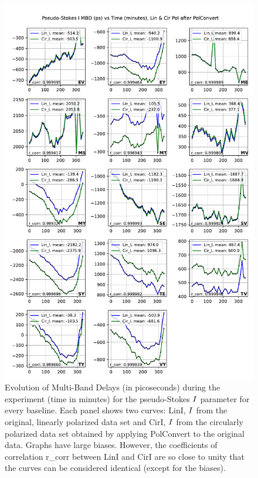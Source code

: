 \documentclass[letterpaper,twoside,12pt]{article}
\begin{document}
\begin{figure}[ht!]
  \begin{center}
  \includegraphics[width=33pc]{MBD_Lin_I_and_Cir_I.pdf}
  \caption{\small Evolution of Multi-Band Delays (in picoseconds) during the experiment (time in minutes) for the pseudo-Stokes $\protect I$ parameter for every baseline. Each panel shows two curves: LinI, $\protect I$ from the original, linearly polarized data set and CirI, $\protect I$ from the circularly polarized data set obtained by applying PolConvert to the original data. Graphs have large biases. However, the coefficients of correlation r\_corr between LinI and CirI are so close to unity that the curves can be considered identical (except for the biases).}
  \label{mbd_lin_and_cir}
  \end{center}
\end{figure}
\end{document}
